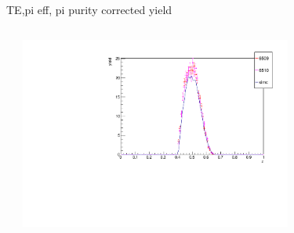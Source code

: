 \begin{frame}{TE,pi eff, pi purity corrected yield}
\begin{columns}
\begin{column}[T]{0.5\textwidth}
\end{column}
\begin{column}[T]{0.5\textwidth}
\includegraphics[width = 0.7\textwidth]{results/yield/check/yieldcheck_340_pos.pdf}
\end{column}
\end{columns}
\end{frame}
